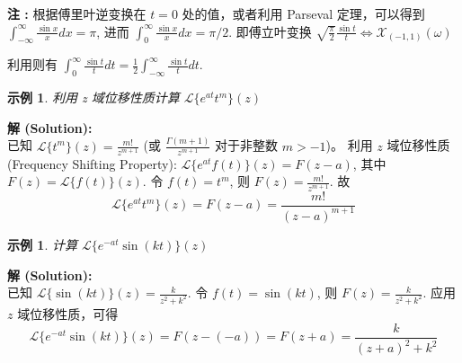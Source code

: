 \documentclass[linespread=1.5,openany]{book}%
\def\diff{d}%
\theoremstyle{plain}
\newtheorem{example}[theorem]{示例}
\newcommand{\diff}{\mathop{}\!\mathrm{d}}  %
\begin{document}
{{{{{{								\vspace{\baselineskip}
								\textbf{注 :}
								根据傅里叶逆变换在 $t=0$ 处的值，或者利用 Parseval 定理，可以得到 $\int_{-\infty}^\infty \frac{\sin x}{x} \diff x = \pi$, 进而 $\int_0^\infty \frac{\sin x}{x} \diff x = \pi/2$.
								即傅立叶变换 $\sqrt{\frac{\pi}{2}} \frac{\sin t}{t} \Leftrightarrow \mathcal{X}_{(-1,1)}(\omega)$
								
								
								利用则有 $\int_0^\infty \frac{\sin t}{t} \diff t = \frac{1}{2} \int_{-\infty}^\infty \frac{\sin t}{t} \diff t$.
								
								\vspace{\baselineskip}
								
								\begin{example}利用 z 域位移性质计算 $\mathcal{L}\{e^{at}t^m\}(z)$ \label{ex:L15_z_shift_eat_tm}
								\end{example}
								\noindent\textbf{解 (Solution):} \\
								已知 $\mathcal{L}\{t^m\}(z) = \frac{m!}{z^{m+1}}$ (或 $\frac{\Gamma(m+1)}{z^{m+1}}$ 对于非整数 $m>-1$)。
								利用 $z$ 域位移性质 (Frequency Shifting Property): $\mathcal{L}\{e^{at}f(t)\}(z) = F(z-a)$, 其中 $F(z) = \mathcal{L}\{f(t)\}(z)$.
								令 $f(t) = t^m$, 则 $F(z) = \frac{m!}{z^{m+1}}$.
								故
								\[ \mathcal{L}\{e^{at}t^m\}(z) = F(z-a) = \frac{m!}{(z-a)^{m+1}} \]
								\vspace{\baselineskip}
								
								\begin{example}计算 $\mathcal{L}\{e^{-at}\sin(kt)\}(z)$ \label{ex:L15_z_shift_eatsinkt}
								\end{example}
								\noindent\textbf{解 (Solution):} \\
								已知 $\mathcal{L}\{\sin(kt)\}(z) = \frac{k}{z^2+k^2}$.
								令 $f(t) = \sin(kt)$, 则 $F(z) = \frac{k}{z^2+k^2}$.
								应用 $z$ 域位移性质，可得
								\[ \mathcal{L}\{e^{-at}\sin(kt)\}(z) = F(z-(-a)) = F(z+a) = \frac{k}{(z+a)^2+k^2} \]
								\vspace{\baselineskip}
								
}}}}}}
\end{document}
